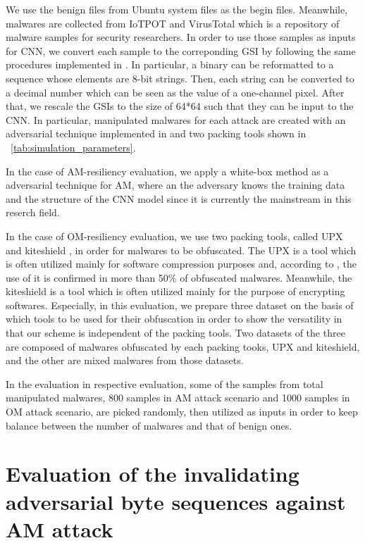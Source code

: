 We use the benign files from Ubuntu system files \cite{ubuntu} as the begin files.
Meanwhile, malwares are collected from IoTPOT \cite{iotpot} and VirusTotal \cite{virustotal} which is a repository of malware samples for security researchers.
In order to use those samples as inputs for CNN, we convert each sample to the correponding GSI by following the same procedures implemented in \cite{previous}.
In particular, a binary can be reformatted to a sequence whose elements are 8-bit strings.
Then, each string can be converted to a decimal number which can be seen as the value of a one-channel pixel.
After that, we rescale the GSIs to the size of 64*64 such that they can be input to the CNN.
In particular, manipulated malwares for each attack are created with an adversarial technique implemented in \cite{ae} and two packing tools \cite{upx, kiteshield} shown in \tablename~\ref{tab:simulation_parameters}.

In the case of AM-resiliency evaluation, we apply a white-box method as a adversarial technique for AM, where an the adversary knows the training data and the structure of the CNN model since it is currently the mainstream in this reserch field.

In the case of OM-resiliency evaluation, we use two packing tools, called UPX \cite{upx} and kiteshield \cite{kiteshield}, in order for malwares to be obfuscated.
The UPX is a tool which is often utilized mainly for software compression purposes and, according to \cite{pack_research}, the use of it is confirmed in more than 50\% of obfuscated malwares. 
Meanwhile, the kiteshield is a tool which is often utilized mainly for the purpose of encrypting softwares.
Especially, in this evaluation, we prepare three dataset on the basis of which tools to be used for their obfuscation in order to show the versatility in that our scheme is independent of the packing tools.
Two datasets of the three are composed of malwares obfuscated by each packing tooks, UPX and kiteshield, and the other are mixed malwares from those datasets. 

In the evaluation in respective evaluation, some of the samples from total manipulated malwares, 800 samples in AM attack scenario and 1000 samples in OM attack scenario, are picked randomly, then utilized as inputs in order to keep balance between the number of malwares and that of benign ones.

\section{Evaluation of the invalidating adversarial byte sequences against AM attack}


